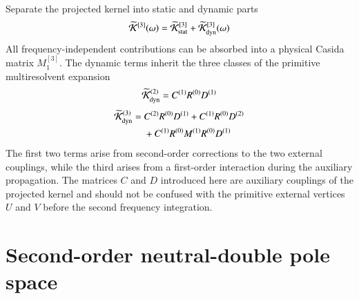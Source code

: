 \documentclass[aip,jcp,reprint,noshowkeys,superscriptaddress]{revtex4-1}
\begin{document}
Separate the projected kernel into static and dynamic parts
\begin{equation}
	\widetilde{\mathcal K}^{[3]}(\omega)
	=
	\widetilde{\mathcal K}_{\rm stat}^{[3]}
	+
	\widetilde{\mathcal K}_{\rm dyn}^{[3]}(\omega)
	\label{eq:static_dynamic}
\end{equation}
All frequency-independent contributions can be absorbed into a physical Casida matrix $M_1^{[3]}$.
The dynamic terms inherit the three classes of the primitive multiresolvent expansion
\begin{equation}
	\widetilde{\mathcal K}_{\rm dyn}^{(2)}
	=
	C^{(1)}R^{(0)}D^{(1)}
	\label{eq:K_dyn_second}
\end{equation}
\begin{equation}
	\begin{split}
	\widetilde{\mathcal K}_{\rm dyn}^{(3)}
	={}&
	C^{(2)}R^{(0)}D^{(1)}
	+
	C^{(1)}R^{(0)}D^{(2)}
	\\
	&+
	C^{(1)}R^{(0)}M^{(1)}R^{(0)}D^{(1)}
	\end{split}
	\label{eq:K_dyn_third}
\end{equation}
The first two terms arise from second-order corrections to the two external couplings, while the third arises from a first-order interaction during the auxiliary propagation.
The matrices $C$ and $D$ introduced here are auxiliary couplings of the projected kernel and should not be confused with the primitive external vertices $U$ and $V$ before the second frequency integration.

\section{Second-order neutral-double pole space}
\label{sec:double_space}
\end{document}

